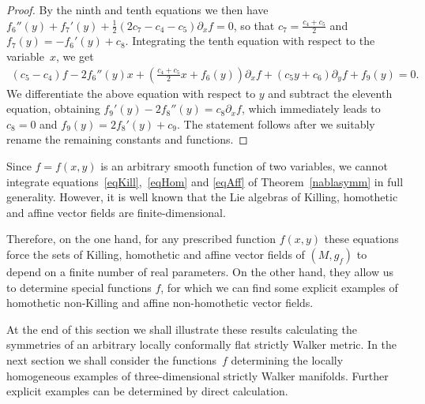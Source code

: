 \documentclass[10pt,a4paper]{amsart}
\numberwithin{equation}{section}
\begin{document}
\begin{proof}
By the ninth and tenth equations we then have $f_6 ''(y)+f_7 '(y)+\frac12(2c_7-c_4-c_5)\partial_xf=0$, so that $c_7=\frac{c_4+c_5}{2}$ and $f_7(y)=-f_6 '(y)+c_8$. Integrating the tenth equation with respect to the variable~$x$, we get
\begin{gather*}
(c_5-c_4)f-2f_6 ''(y)x+\left(\frac{c_4+c_5}{2}x+f_6(y)\right)\partial_xf+(c_5y+c_6)\partial_yf+f_9(y)=0.
\end{gather*}
We dif\/ferentiate the above equation with respect to $y$ and subtract the eleventh equation, obtaining $f_9 '(y)-2f_8 ''(y)=c_8\partial_xf$, which immediately leads to $c_8=0$ and $f_9(y)=2f_8 '(y)+c_9$. The statement follows after we {suitably rename} the remaining constants and functions.
\end{proof}

\begin{Remark}Since $f=f(x,y)$ is an arbitrary smooth function of two variables, we cannot integrate equations~\eqref{eqKill},~\eqref{eqHom} and \eqref{eqAff} of Theorem~\ref{nablasymm} in full generality. However, it is well known that the Lie algebras of Killing, homothetic and af\/f\/ine vector f\/ields are f\/inite-dimensional.

Therefore, on the one hand, for any prescribed function $f(x,y)$ these equations force the sets of Killing, homothetic and af\/f\/ine vector f\/ields of $(M,g_f)$ to depend on a f\/inite number of real parameters. On the other hand, they allow us to determine special functions $f$, for which we can f\/ind some explicit examples of homothetic non-Killing and af\/f\/ine non-homothetic vector f\/ields.

At the end of this {section} we shall illustrate these results calculating the symmetries of an arbitrary locally conformally f\/lat strictly Walker metric. In the next section we shall consider the functions~$f$ determining the locally homogeneous examples of three-dimensional strictly Walker manifolds. Further explicit examples can be determined by direct calculation.
\end{Remark}
\end{document}
